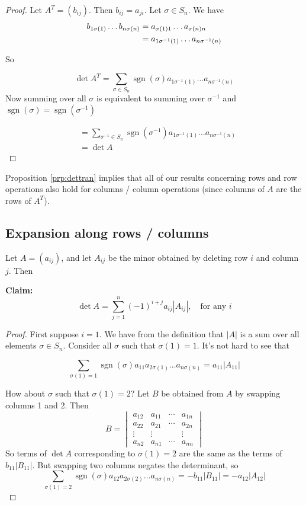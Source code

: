 \documentclass{article}
\theoremstyle{definition} \newtheorem*{definition}{Definition}
\DeclareMathOperator{\sgn}{sgn} \DeclareMathOperator{\id}{id}
\begin{document}
\begin{proof} Let $A^T = (b_{ij})$. Then $b_{ij} = a_{ji}$. Let $\sigma \in
  S_n$. We have \begin{align*} b_{{1}\sigma(1)} \dots b_{{n}\sigma(n)} &=
    a_{\sigma(1)1} \dots a_{\sigma(n)n} \\ &= a_{1\sigma^{-1}(1)}\dots a_{n
      \sigma^{-1}(n)} \end{align*}

So 

\[ \det A^T = \sum_{\sigma \in S_n}\sgn(\sigma)  a_{1\sigma^{-1}(1)}\dots a_{n
\sigma^{-1}(n)} \] Now summing over all $\sigma$ is equivalent to summing over
$\sigma^{-1}$ and $\sgn(\sigma) = \sgn(\sigma^{-1})$

\begin{align*} &= \sum_{\sigma^{-1} \in S_n}\sgn
  (\sigma^{-1})a_{1\sigma^{-1}(1)}\dots a_{n \sigma^{-1}(n)}\\ &= \det A
\end{align*} \end{proof} Proposition \ref{prp:dettran}  implies that all of our
results concerning rows and row operations also hold for columns / column
operations (since columns of $A$ are the rows of $A^T$).

\subsection*{Expansion along rows / columns} Let $A = (a_{ij} )$, and let
$A_{ij}$ be the minor obtained by deleting row $i$ and column $j$. Then

\textbf{Claim:} \[ \det A = \sum_{j=1}^n (-1)^{i+j}a_{ij}|A_{ij}|, \quad
\text{for any } i \]

\begin{proof} First suppose $i = 1$. We have from the definition that $|A|$ is
  a sum over all elements $\sigma \in S_n$. Consider all $\sigma$ such that
  $\sigma(1) = 1$. It's not hard to see that

  \[ \sum_{\sigma(1)=1}\sgn(\sigma)a_{11}a_{2\sigma(1)}\dots a_{n\sigma(n)} =
  a_{11}|A_{11}| \]

  How about $\sigma$ such that $\sigma(1) = 2$? Let $B$ be obtained from $A$ by
  swapping columns 1 and 2. Then \[ B = \begin{vmatrix} a_{12} & a_{11} &
      \cdots & a_{1n} \\ a_{22} & a_{21} & \cdots & a_{2n} \\ \vdots & \vdots &
      & \vdots  \\ a_{n2} & a_{n1} & \cdots & a_{nn} \end{vmatrix} \] So terms
    of $\det A$ corresponding to $\sigma(1) = 2$ are the same as the terms of
    $b_{11}|B_{11}|$. But swapping two columns negates the determinant, so \[
      \sum_{\sigma(1)=2}\sgn (\sigma) a_{12}a_{2\sigma(2)} \dots a_{n\sigma(n)}
      = -b_{11}|B_{11}| = -a_{12}|A_{12}| \] \end{proof} 
    
\end{document}
